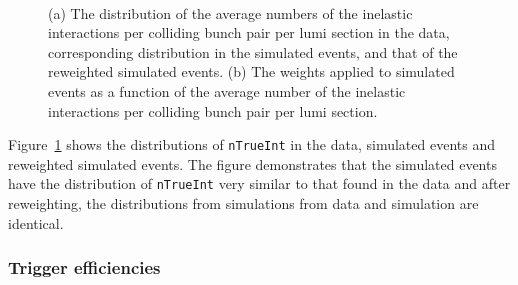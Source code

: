 \begin{figure}[h!]
  \centering
   ~
  \caption{(a) The distribution of the average numbers of the
    inelastic interactions per colliding bunch pair per lumi section
    in the data, corresponding distribution in the simulated events,
    and that of the reweighted simulated events. (b) The weights
    applied to simulated events as a function of the average number of
    the inelastic interactions per colliding bunch pair per lumi
    section.}
  \label{f044_corr_nTrueInt_data_mc_norm}
\end{figure}

Figure~\ref{f044_corr_nTrueInt_data_mc_norm} shows the distributions
of \verb!nTrueInt! in the data, simulated events and reweighted
simulated events. The figure demonstrates that the simulated events
have the distribution of \verb!nTrueInt! very similar to that found in
the data and after reweighting, the distributions from simulations
from data and simulation are identical.

\subsubsection{Trigger efficiencies}
\label{sec:trigger-sf}

